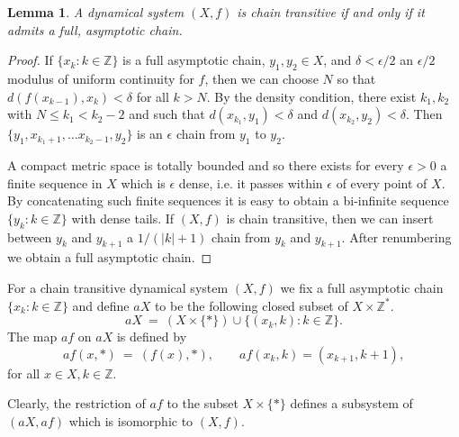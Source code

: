 \documentclass[12pt]{amsart}
\newtheorem{lem}[theo]{{\bfseries Lemma}}
\def \Z {\mathbb Z}
\def \ep {\epsilon}
\def \d {\delta}
\numberwithin{equation}{section}
\begin{document}
\begin{lem}\label{lem1.04} A dynamical system $(X,f)$ is chain transitive if and only if it admits a full, asymptotic chain. \end{lem}

\begin{proof} If $\{ x_k : k \in \Z \}$ is a full asymptotic chain, $y_1, y_2 \in X$, and $\d < \ep/2$ an $\ep/2$ modulus of uniform
continuity for $f$, then we can choose $N$ so that  $d(f(x_{k-1}),x_k) < \d$ for all $k > N$. By the density condition, there exist $k_1, k_2$ with
$N \le k_1  < k_2 - 2$ and such that $d(x_{k_1},y_1) < \d$ and $d(x_{k_2},y_2) < \d$. Then $\{ y_1, x_{k_1+1}, \dots x_{k_2 - 1}, y_2 \}$
is an $\ep$ chain from $y_1$ to $y_2$.

A compact metric space is totally bounded and so there exists for every $\ep > 0$ a finite sequence in $X$ which is $\ep$ dense,
i.e. it passes within $\ep$ of every point of $X$.
By concatenating such finite sequences it is easy to obtain a bi-infinite sequence $\{ y_k : k \in \Z \}$ with dense tails. If $(X,f)$ is chain
transitive, then we can insert between $y_{k}$ and $y_{k+1}$ a $1/(|k| + 1)$ chain from $y_{k}$ and $y_{k+1}$. After renumbering we obtain
a full asymptotic chain.

\end{proof}\vspace{1cm}

For a chain transitive dynamical system $(X,f)$ we fix a full asymptotic chain $\{ x_k : k \in \Z \}$ and
define $aX$ to be the following closed subset of $X \times \Z^*$.
 \begin{equation}\label{eq1.11}
 aX \ = \ (X \times \{ * \}) \cup \{ (x_k,k) : k \in \Z \}.
 \end{equation}
 The map $af$ on $aX$ is defined by
 \begin{equation}\label{eq1.12}
 af(x,*) \ = \ (f(x),*), \qquad af(x_k,k) = (x_{k+1},k+1),
 \end{equation}
 for all  $ x \in X, k \in \Z$.

Clearly, the restriction of $af$ to the subset $X \times \{ * \}$ defines  a subsystem of $(aX, af)$ which is isomorphic to $(X,f)$.
 \vspace{.25cm}
\end{document}
